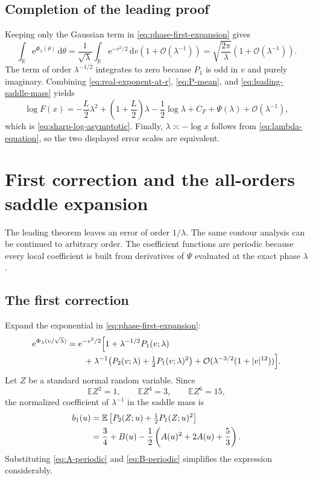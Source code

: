 \documentclass[11pt,oneside]{article}
\theoremstyle{definition}
\theoremstyle{remark}
\newcommand{\R}{\mathbb R}
\newcommand{\e}{\mathrm e}
\newcommand{\dd}{\,\mathrm d}
\newcommand{\E}{\mathbb E}
\newcommand{\bigO}{\mathcal O}
\begin{document}
\subsection{Completion of the leading proof}

Keeping only the Gaussian term in \eqref{eq:phase-first-expansion} gives
\begin{equation}
 \int_\R\e^{\Phi_\lambda(\theta)}\dd\theta
 =\frac1{\sqrt\lambda}\int_\R\e^{-v^2/2}\dd v
  \left(1+\bigO(\lambda^{-1})\right)
 =\sqrt{\frac{2\pi}{\lambda}}
  \left(1+\bigO(\lambda^{-1})\right).                     \label{eq:leading-saddle-mass}
\end{equation}
The term of order $\lambda^{-1/2}$ integrates to zero because $P_1$ is odd in $v$ and purely
imaginary.  Combining \eqref{eq:real-exponent-at-r}, \eqref{eq:P-mean}, and
\eqref{eq:leading-saddle-mass} yields
\begin{equation*}
 \log F(x)
 =-\frac L2\lambda^2+
 \left(1+\frac L2\right)\lambda-\frac12\log\lambda
 +C_F+\Psi(\lambda)+\bigO(\lambda^{-1}),
\end{equation*}
which is \eqref{eq:sharp-log-asymptotic}.  Finally,
$\lambda\asymp-\log x$ follows from \eqref{eq:lambda-equation}, so the two displayed error
scales are equivalent.

\section{First correction and the all-orders saddle expansion}
\label{sec:full-asymptotic}

The leading theorem leaves an error of order $1/\lambda$.  The same contour analysis can be
continued to arbitrary order.  The coefficient functions are periodic because every local
coefficient is built from derivatives of $\Psi$ evaluated at the exact phase $\lambda$.

\subsection{The first correction}

Expand the exponential in \eqref{eq:phase-first-expansion}:
\begin{align}
 \e^{\Phi_\lambda(v/\sqrt\lambda)}
 &=\e^{-v^2/2}\Bigl[1+\lambda^{-1/2}P_1(v;\lambda) \\[-0.3ex]
 &\qquad+\lambda^{-1}\bigl(P_2(v;\lambda)+\tfrac12P_1(v;\lambda)^2\bigr)
 +\bigO(\lambda^{-3/2}(1+|v|^{12}))\Bigr].                \label{eq:exp-phase-first}
\end{align}
Let $Z$ be a standard normal random variable.  Since
\begin{equation}
 \E Z^2=1,\qquad \E Z^4=3,\qquad \E Z^6=15,               \label{eq:gaussian-moments}
\end{equation}
the normalized coefficient of $\lambda^{-1}$ in the saddle mass is
\begin{align}
 b_1(u)
 &=\E\left[P_2(Z;u)+\tfrac12P_1(Z;u)^2\right]             \notag\\
 &=\frac34+B(u)-\frac12\left(A(u)^2+2A(u)+\frac53\right). \label{eq:b1-gaussian}
\end{align}
Substituting \eqref{eq:A-periodic} and \eqref{eq:B-periodic} simplifies the expression
considerably.
\end{document}
